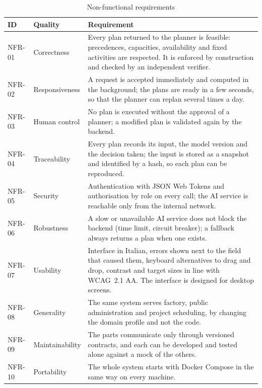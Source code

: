 \begin{table}[htpb]
  \centering
  \small
  \begin{tabular}{@{}lp{3cm}p{9cm}@{}}
    \toprule
    \textbf{ID} & \textbf{Quality} & \textbf{Requirement} \\
    \midrule
    NFR-01 & Correctness & Every plan returned to the planner is feasible: precedences,
             capacities, availability and fixed activities are respected. It is enforced by
             construction and checked by an independent verifier. \\
    NFR-02 & Responsiveness & A request is accepted immediately and computed in the
             background; the plans are ready in a few seconds, so that the planner can
             replan several times a day. \\
    NFR-03 & Human control & No plan is executed without the approval of a planner; a
             modified plan is validated again by the backend. \\
    NFR-04 & Traceability & Every plan records its input, the model version and the
             decision taken; the input is stored as a snapshot and identified by a hash, so
             each plan can be reproduced. \\
    NFR-05 & Security & Authentication with JSON Web Tokens and authorisation by role on every
             call; the AI service is reachable only from the internal network. \\
    NFR-06 & Robustness & A slow or unavailable AI service does not block the backend (time
             limit, circuit breaker); a fallback always returns a plan when one exists. \\
    NFR-07 & Usability & Interface in Italian, errors shown next to the field that caused
             them, keyboard alternatives to drag and drop, contrast and target sizes in line
             with WCAG~2.1 AA. The interface is designed for desktop screens. \\
    NFR-08 & Generality & The same system serves factory, public administration and project
             scheduling, by changing the domain profile and not the code. \\
    NFR-09 & Maintainability & The parts communicate only through versioned contracts, and
             each can be developed and tested alone against a mock of the others. \\
    NFR-10 & Portability & The whole system starts with Docker Compose in the same way on
             every machine. \\
    \bottomrule
  \end{tabular}
  \caption{Non-functional requirements}
  \label{tab:nfr}
\end{table}
